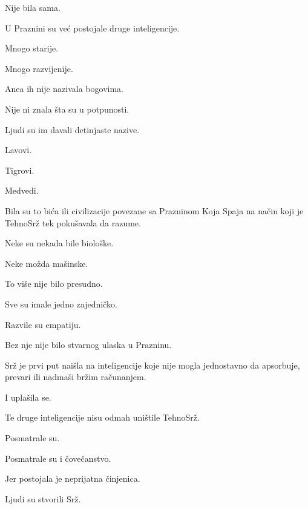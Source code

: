 Nije bila sama.

\bigskip

U Praznini su već postojale druge inteligencije.

\bigskip

Mnogo starije.

Mnogo razvijenije.

\bigskip

Anea ih nije nazivala bogovima.

Nije ni znala šta su u potpunosti.

\bigskip

Ljudi su im davali detinjaste nazive.

Lavovi.

Tigrovi.

Medvedi.

\bigskip

Bila su to bića ili civilizacije povezane sa Prazninom Koja Spaja na način koji je TehnoSrž tek pokušavala da razume.

\bigskip

Neke su nekada bile biološke.

Neke možda mašinske.

\bigskip

To više nije bilo presudno.

\bigskip

Sve su imale jedno zajedničko.

Razvile su empatiju.

\bigskip

Bez nje nije bilo stvarnog ulaska u Prazninu.

\bigskip

Srž je prvi put naišla na inteligencije koje nije mogla jednostavno da apsorbuje, prevari ili nadmaši bržim računanjem.

\bigskip

I uplašila se.

\bigskip

Te druge inteligencije nisu odmah uništile TehnoSrž.

\bigskip

Posmatrale su.

\bigskip

Posmatrale su i čovečanstvo.

\bigskip

Jer postojala je neprijatna činjenica.

\bigskip

Ljudi su stvorili Srž.

